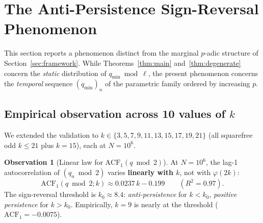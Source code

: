 \documentclass[11pt,a4paper]{article}
\theoremstyle{plain}
\theoremstyle{definition}
\newtheorem{observation}[theorem]{Observation}
\newcommand{\qmin}{q_{\min}}
\begin{document}
\section{The Anti-Persistence Sign-Reversal Phenomenon}
\label{sec:anti-persistence}

This section reports a phenomenon distinct from the marginal $p$-adic structure
of Section~\ref{sec:framework}. While Theorems~\ref{thm:main} and~\ref{thm:degenerate}
concern the \emph{static} distribution of $\qmin \bmod \ell$, the present
phenomenon concerns the \emph{temporal} sequence $(\qmin)_n$ of the parametric
family ordered by increasing $p$.

\subsection{Empirical observation across 10 values of $k$}

We extended the validation to $k \in \{3, 5, 7, 9, 11, 13, 15, 17, 19, 21\}$
(all squarefree odd $k \le 21$ plus $k = 15$), each at $N = 10^6$.

\begin{discoverybox}
\begin{observation}[Linear law for $\mathrm{ACF}_1(q \bmod 2)$]\label{disc:acf}
At $N = 10^6$, the lag-1 autocorrelation of $(q_n \bmod 2)$ varies
\textbf{linearly with $k$}, not with $\varphi(2k)$:
\[
\mathrm{ACF}_1(q \bmod 2; k) \approx 0.0237\,k - 0.199 \qquad (R^2 = 0.97).
\]
The sign-reversal threshold is $k_0 \approx 8.4$: \emph{anti-persistence} for
$k < k_0$, \emph{positive persistence} for $k > k_0$. Empirically, $k=9$ is
nearly at the threshold ($\mathrm{ACF}_1 = -0.0075$).
\end{observation}
\end{discoverybox}
\end{document}
